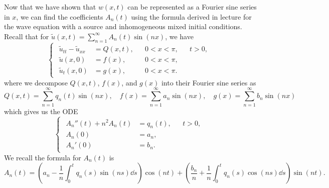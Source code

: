 \documentclass[plain]{pset}
\begin{document}
\begin{solution}
    Now that we have shown that \(w(x, t)\) can be represented as a Fourier sine series in \(x\), we can find the coefficients \(A_n(t)\) using the formula derived in lecture for the wave equation with a source and inhomogeneous mixed initial conditions. Recall that for \(\tilde{u}(x, t) = \sum_{n = 1}^\infty A_n(t) \sin(nx)\), we have
    \[
        \begin{cases}
            \begin{aligned}
                \tilde{u}_{tt} - \tilde{u}_{xx} & = Q(x, t), &  & 0 < x < \pi, &  & t > 0, \\
                \tilde{u}(x, 0)                 & = f(x),    &  & 0 < x < \pi,             \\
                \tilde{u}_t(x, 0)               & = g(x),    &  & 0 < x < \pi.
            \end{aligned}
        \end{cases}
    \]
    where we decompose \(Q(x, t)\), \(f(x)\), and \(g(x)\) into their Fourier sine series as
    \[Q(x, t) = \sum_{n = 1}^\infty q_n(t) \sin(nx), \quad f(x) = \sum_{n = 1}^\infty a_n \sin(nx), \quad g(x) = \sum_{n = 1}^\infty b_n \sin(nx)\]
    which gives us the ODE
    \[
        \begin{cases}
            \begin{aligned}
                A_n''(t) + n^2A_n(t) & = q_n(t), &  & t > 0, \\
                A_n(0)               & = a_n,    &  &        \\
                A_n'(0)              & = b_n.    &  &
            \end{aligned}
        \end{cases}
    \]
    We recall the formula for \(A_n(t)\) is
    \[A_n(t) = \left(a_n - \frac{1}{n}\int_0^t q_n(s)\sin(ns) \dd{s}\right)\cos(nt) + \left(\frac{b_n}{n} + \frac{1}{n}\int_0^t q_n(s)\cos(ns) \dd{s}\right)\sin(nt).\]


\end{solution}
\end{document}
